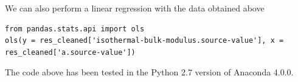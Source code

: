 \documentclass[%
 reprint,
 nofootinbib,
 amsmath,amssymb,
 aps,
]{revtex4-1}
\begin{document}
We can also perform a linear regression with the data obtained above
\begin{lstlisting}
from pandas.stats.api import ols
ols(y = res_cleaned['isothermal-bulk-modulus.source-value'], x = res_cleaned['a.source-value'])
\end{lstlisting}
The code above has been tested in the Python 2.7 version of Anaconda 4.0.0.






\nocite{*}

\end{document}
